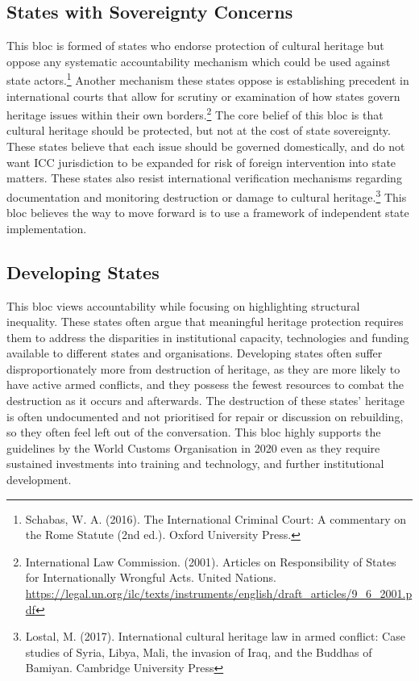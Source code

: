 \subsection{States with Sovereignty Concerns}

This bloc is formed of states who endorse protection of cultural heritage but oppose any systematic accountability mechanism which could be used against state actors.\footnote{Schabas, W. A. (2016). The International Criminal Court: A commentary on the Rome Statute (2nd ed.). Oxford University Press.} Another mechanism these states oppose is establishing precedent in international courts that allow for scrutiny or examination of how states govern heritage issues within their own borders.\footnote{International Law Commission. (2001). Articles on Responsibility of States for Internationally Wrongful Acts. United Nations. \url{https://legal.un.org/ilc/texts/instruments/english/draft_articles/9_6_2001.pdf}} The core belief of this bloc is that cultural heritage should be protected, but not at the cost of state sovereignty. These states believe that each issue should be governed domestically, and do not want ICC jurisdiction to be expanded for risk of foreign intervention into state matters. These states also resist international verification mechanisms regarding documentation and monitoring destruction or damage to cultural heritage.\footnote{Lostal, M. (2017). International cultural heritage law in armed conflict: Case studies of Syria, Libya, Mali, the invasion of Iraq, and the Buddhas of Bamiyan. Cambridge University Press} This bloc believes the way to move forward is to use a framework of independent state implementation.

\subsection{Developing States}

This bloc views accountability while focusing on highlighting structural inequality. These states often argue that meaningful heritage protection requires them to address the disparities in institutional capacity, technologies and funding available to different states and organisations. Developing states often suffer disproportionately more from destruction of heritage, as they are more likely to have active armed conflicts, and they possess the fewest resources to combat the destruction as it occurs and afterwards. The destruction of these states' heritage is often undocumented and not prioritised for repair or discussion on rebuilding, so they often feel left out of the conversation. This bloc highly supports the guidelines by the World Customs Organisation in 2020 even as they require sustained investments into training and technology, and further institutional development.
